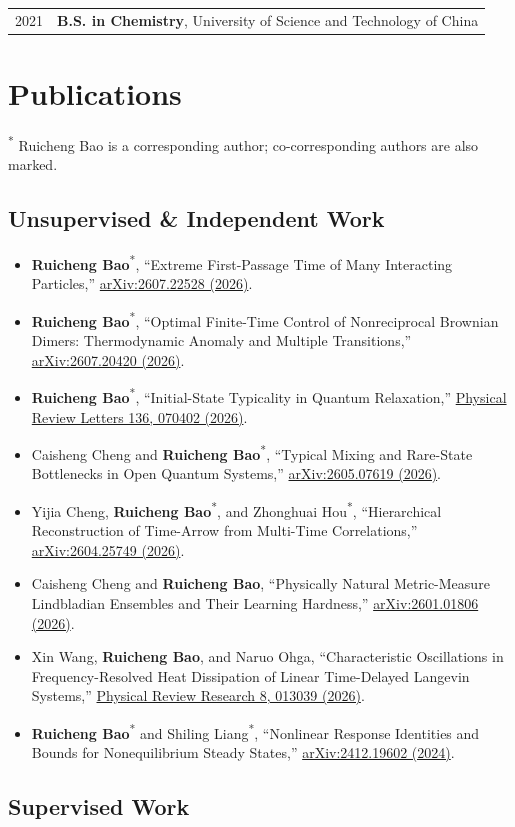 \documentclass[10pt,a4paper]{article}
\makeatletter
\newcommand{\entry}[2]{%
  \begin{tabularx}{\textwidth}{@{}p{0.19\textwidth}X@{}}
    \color{muted}#1 & #2
  \end{tabularx}\par
}
\newcommand{\pub}[4]{%
  \item #1, ``#2,'' \href{#4}{#3}.
}
\newcommand{\corr}[1]{#1\textsuperscript{*}}
\makeatother
\begin{document}
\entry{2021}{\textbf{B.S. in Chemistry}, University of Science and Technology of China}

\section{Publications}

{\footnotesize\color{muted}\textsuperscript{*} Ruicheng Bao is a corresponding author; co-corresponding authors are also marked.}

\subsection{Unsupervised \& Independent Work}

\begin{itemize}
  \pub{\corr{\textbf{Ruicheng Bao}}}{Extreme First-Passage Time of Many Interacting Particles}{arXiv:2607.22528 (2026)}{https://arxiv.org/abs/2607.22528}
  \pub{\corr{\textbf{Ruicheng Bao}}}{Optimal Finite-Time Control of Nonreciprocal Brownian Dimers: Thermodynamic Anomaly and Multiple Transitions}{arXiv:2607.20420 (2026)}{https://arxiv.org/abs/2607.20420}
  \pub{\corr{\textbf{Ruicheng Bao}}}{Initial-State Typicality in Quantum Relaxation}{Physical Review Letters 136, 070402 (2026)}{https://doi.org/10.1103/wgr5-lb6b}
  \pub{Caisheng Cheng and \corr{\textbf{Ruicheng Bao}}}{Typical Mixing and Rare-State Bottlenecks in Open Quantum Systems}{arXiv:2605.07619 (2026)}{https://arxiv.org/abs/2605.07619}
  \pub{Yijia Cheng, \corr{\textbf{Ruicheng Bao}}, and \corr{Zhonghuai Hou}}{Hierarchical Reconstruction of Time-Arrow from Multi-Time Correlations}{arXiv:2604.25749 (2026)}{https://arxiv.org/abs/2604.25749}
  \pub{Caisheng Cheng and \textbf{Ruicheng Bao}}{Physically Natural Metric-Measure Lindbladian Ensembles and Their Learning Hardness}{arXiv:2601.01806 (2026)}{https://arxiv.org/abs/2601.01806}
  \pub{Xin Wang, \textbf{Ruicheng Bao}, and Naruo Ohga}{Characteristic Oscillations in Frequency-Resolved Heat Dissipation of Linear Time-Delayed Langevin Systems}{Physical Review Research 8, 013039 (2026)}{https://doi.org/10.1103/x2dm-9p8m}
  \pub{\corr{\textbf{Ruicheng Bao}} and \corr{Shiling Liang}}{Nonlinear Response Identities and Bounds for Nonequilibrium Steady States}{arXiv:2412.19602 (2024)}{https://arxiv.org/abs/2412.19602}
\end{itemize}

\newpage
\subsection{Supervised Work}
\end{document}
